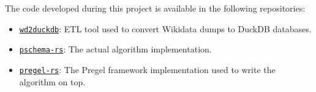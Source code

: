 The code developed during this project is available in the following repositories:

\begin{itemize}
    \itemsep0.25em
    \item \href{https://github.com/angelip2303/wd2duckdb}{\texttt{wd2duckdb}}: ETL tool used to convert Wikidata dumps to DuckDB databases.
    \item \href{https://github.com/angelip2303/pschema-rs}{\texttt{pschema-rs}}: The actual algorithm implementation.
    \item \href{https://github.com/angelip2303/pregel-rs}{\texttt{pregel-rs}}: The Pregel framework implementation used to write the algorithm on top.
\end{itemize}
